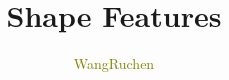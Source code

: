 \documentclass[notheorems,serif,table,compress]{beamer}  %
\begin{document}
\title{Shape Features}
\author[]{\textcolor{olive}{WangRuchen}}
\frame{ \titlepage }
\def\hilite<#1>{\temporal<#1>{\color{blue!15}}{\color{black}}{\color{black}}}
\newcommand{\shadow}[2][purple]{\hskip5pt\shadowbox{\color{#1}\small \kai #2\vspace{3mm}}}
\newcommand{\colorrbox}[2][purple]{\doublebox{\color{#1}\small \kai#2}}

\end{document}
